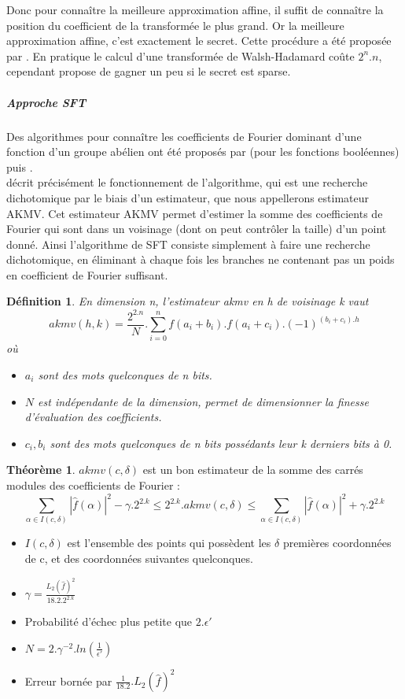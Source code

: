 \documentclass{article}		%
\newtheorem{defi}{Définition}
\theoremstyle{definition}
\newtheorem{theo}{Théorème}
\theoremstyle{plain}
\theoremstyle{plain}
\theoremstyle{plain}
\theoremstyle{plain}
\theoremstyle{plain}
\begin{document}
Donc pour connaître la meilleure approximation affine, il suffit de connaître la position du coefficient de la transformée
le plus grand. Or la meilleure approximation affine, c'est exactement le
secret.
 Cette procédure a été proposée par \cite{LF}.
En pratique le calcul d'une transformée de Walsh-Hadamard coûte $2^n.n$,
cependant \cite{Kirchner} propose de gagner un peu si le secret est
sparse. 
 
\subparagraph{Approche SFT}
\label{SFT}
Des algorithmes pour connaître les coefficients de Fourier dominant d'une fonction d'un groupe
abélien ont été proposés par \cite{Mansour} (pour les fonctions booléennes)
puis  \cite{Akavia}.
\\
\cite{Vaudenay} décrit précisément le fonctionnement de
l'algorithme, qui est une recherche dichotomique par le biais d'un
estimateur, que nous appellerons estimateur AKMV. Cet estimateur AKMV
permet d'estimer la somme des coefficients de Fourier qui sont dans un
voisinage (dont on peut contrôler la taille) d'un point donné. Ainsi
l'algorithme de SFT consiste simplement à faire une recherche
dichotomique, en éliminant à chaque fois les branches ne contenant pas un
poids en coefficient de Fourier suffisant.
\begin{defi}
 En dimension n, l'estimateur akmv en h de voisinage k vaut
$$akmv(h, k)=\frac{2^{2.n}}{N}.\sum_{i=0}^{n}
f(a_i+b_i).f(a_i+c_i).(-1)^{(b_i+c_i).h}$$
où 
\begin{itemize}
\item $a_i$ sont des mots quelconques de n bits.
\item $N$ est indépendante de la dimension, permet de dimensionner la
finesse d'évaluation des coefficients.
\item $c_i, b_i$ sont des mots quelconques de n bits possédants leur k derniers bits à
0.
\end{itemize}
\end{defi}

\begin{theo}
$akmv(c, \delta)$ est un bon estimateur de la somme des carrés modules des coefficients
de Fourier :
$$\sum_{\alpha\in I(c, \delta)} |\hat{f}(\alpha)|^2 - \gamma.2^{2.k}\leq
2^{2.k}.akmv(c, \delta)\leq
\sum_{\alpha\in I(c, \delta)} |\hat{f}(\alpha)|^2 +  \gamma.2^{2.k}$$
\begin{itemize}
\item $I(c, \delta)$ est l'ensemble des points qui possèdent les $\delta$
premières coordonnées de c, et des coordonnées suivantes quelconques.
\item $\gamma=\frac{L_2(\hat{f})^2}{18.2.2^{2.k}}$
\item Probabilité d'échec plus petite que $2.\epsilon'$ 
\item $N=2.\gamma^{-2}.ln(\frac{1}{\epsilon'})$
\item Erreur bornée par $\frac{1}{18.2}.L_2(\hat{f})^2$ 
\end{itemize} 
\end{theo}
\end{document}
